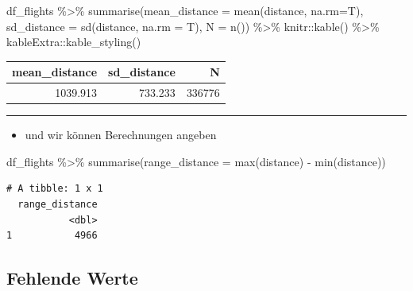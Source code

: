 \documentclass[
  letterpaper,
  DIV=11]{scrartcl}
\newenvironment{Shaded}{\begin{snugshade}}{\end{snugshade}}
\newcommand{\AttributeTok}[1]{\textcolor[rgb]{0.40,0.45,0.13}{#1}}
\newcommand{\FunctionTok}[1]{\textcolor[rgb]{0.28,0.35,0.67}{#1}}
\newcommand{\NormalTok}[1]{\textcolor[rgb]{0.00,0.23,0.31}{#1}}
\newcommand{\SpecialCharTok}[1]{\textcolor[rgb]{0.37,0.37,0.37}{#1}}
\providecommand{\tightlist}{%
  \setlength{\itemsep}{0pt}\setlength{\parskip}{0pt}}\usepackage{longtable,booktabs,array}
\begin{document}
\begin{Shaded}
\begin{Highlighting}[]
\NormalTok{df\_flights }\SpecialCharTok{\%\textgreater{}\%} 
  \FunctionTok{summarise}\NormalTok{(}\AttributeTok{mean\_distance =} \FunctionTok{mean}\NormalTok{(distance, }\AttributeTok{na.rm=}\NormalTok{T),}
            \AttributeTok{sd\_distance =} \FunctionTok{sd}\NormalTok{(distance, }\AttributeTok{na.rm =}\NormalTok{ T),}
            \AttributeTok{N =} \FunctionTok{n}\NormalTok{()) }\SpecialCharTok{\%\textgreater{}\%} 
\NormalTok{  knitr}\SpecialCharTok{::}\FunctionTok{kable}\NormalTok{() }\SpecialCharTok{\%\textgreater{}\%} 
\NormalTok{  kableExtra}\SpecialCharTok{::}\FunctionTok{kable\_styling}\NormalTok{()}
\end{Highlighting}
\end{Shaded}

\begin{table}
\centering
\begin{tabular}{r|r|r}
\hline
mean\_distance & sd\_distance & N\\
\hline
1039.913 & 733.233 & 336776\\
\hline
\end{tabular}
\end{table}

\begin{center}\rule{0.5\linewidth}{0.5pt}\end{center}

\begin{itemize}
\tightlist
\item
  und wir können Berechnungen angeben
\end{itemize}

\begin{Shaded}
\begin{Highlighting}[]
\NormalTok{df\_flights }\SpecialCharTok{\%\textgreater{}\%} 
  \FunctionTok{summarise}\NormalTok{(}\AttributeTok{range\_distance =} \FunctionTok{max}\NormalTok{(distance) }\SpecialCharTok{{-}} \FunctionTok{min}\NormalTok{(distance))}
\end{Highlighting}
\end{Shaded}

\begin{verbatim}
# A tibble: 1 x 1
  range_distance
           <dbl>
1           4966
\end{verbatim}

\hypertarget{fehlende-werte}{%
\subsection{Fehlende Werte}\label{fehlende-werte}}
\end{document}
